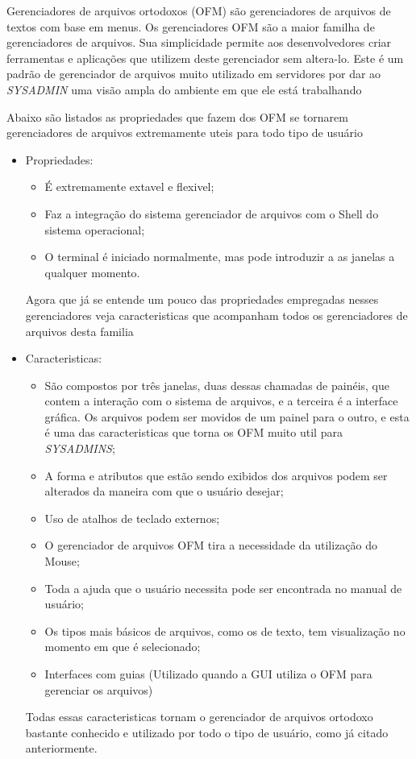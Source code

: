 \documentclass[12pt,a4paper,openany,oneside]{abntex2}
\begin{document}
Gerenciadores de arquivos ortodoxos (OFM) são gerenciadores de arquivos de textos com base em menus. Os gerenciadores OFM são a maior familha de gerenciadores de arquivos. Sua simplicidade permite aos desenvolvedores criar ferramentas e aplicações que utilizem deste gerenciador sem altera-lo. 
Este é um padrão de gerenciador de arquivos muito utilizado em servidores por dar ao \textit{SYSADMIN} uma visão ampla do ambiente em que ele está trabalhando

Abaixo são listados as propriedades que fazem dos OFM se tornarem gerenciadores de arquivos extremamente uteis para todo tipo de usuário

\begin{itemize}
	\item Propriedades: \\
	\begin{itemize}
		\item É extremamente extavel e flexivel;
		\item Faz a integração do sistema gerenciador de arquivos com o Shell do sistema operacional;
		\item O terminal é iniciado normalmente, mas pode introduzir a as janelas a qualquer momento.
	\end{itemize}

Agora que já se entende um pouco das propriedades empregadas nesses gerenciadores veja caracteristicas que acompanham todos os gerenciadores de arquivos desta familia

	\item Caracteristicas: \\ 
	\begin{itemize}
		\item São compostos por três janelas, duas dessas chamadas de painéis, que contem a interação com o sistema de arquivos, e a terceira é a interface gráfica. Os arquivos podem ser movidos de um painel para o outro, e esta é uma das caracteristicas que torna os OFM muito util para \textit{SYSADMINS};
		\item A forma e atributos que estão sendo exibidos dos arquivos podem ser alterados da maneira com que o usuário desejar;
		\item Uso de atalhos de teclado externos;
		\item O gerenciador de arquivos OFM tira a necessidade da utilização do Mouse;
		\item Toda a ajuda que o usuário necessita pode ser encontrada no manual de usuário;
		\item Os tipos mais básicos de arquivos, como os de texto, tem visualização no momento em que é selecionado;
		\item Interfaces com guias (Utilizado quando a GUI utiliza o OFM para gerenciar os arquivos)
	\end{itemize}

Todas essas caracteristicas tornam o gerenciador de arquivos ortodoxo bastante conhecido e utilizado por todo o tipo de usuário, como já citado anteriormente.
\end{itemize}
\end{document}
